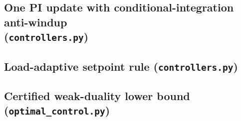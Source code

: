 \documentclass[12pt,a4paper]{report}
\theoremstyle{definition}
\begin{document}
\subsection*{One PI update with conditional-integration anti-windup\\ (\texttt{controllers.py})}


\subsection*{Load-adaptive setpoint rule (\texttt{controllers.py})}


\subsection*{Certified weak-duality lower bound (\texttt{optimal\_control.py})}

\end{document}
